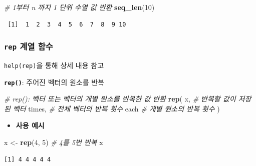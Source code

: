 \documentclass[
  11pt,
]{krantz}
\makeatletter
\newenvironment{Shaded}{\begin{snugshade}}{\end{snugshade}}
\newcommand{\CommentTok}[1]{\textcolor[rgb]{0.37,0.37,0.37}{\textit{#1}}}
\newcommand{\DecValTok}[1]{\textcolor[rgb]{0.06,0.06,0.06}{#1}}
\newcommand{\KeywordTok}[1]{\textcolor[rgb]{0.27,0.27,0.27}{\textbf{#1}}}
\newcommand{\NormalTok}[1]{#1}
\newcommand{\StringTok}[1]{\textcolor[rgb]{0.5,0.5,0.5}{#1}}
\providecommand{\tightlist}{%
  \setlength{\itemsep}{0pt}\setlength{\parskip}{0pt}}
\newenvironment{kframe}{%
\medskip{}
\setlength{\fboxsep}{.8em}
 \def\at@end@of@kframe{}%
 \ifinner\ifhmode%
  \def\at@end@of@kframe{\end{minipage}}%
  \begin{minipage}{\columnwidth}%
 \fi\fi%
 \def\FrameCommand##1{\hskip\@totalleftmargin \hskip-\fboxsep
 \colorbox{shadecolor}{##1}\hskip-\fboxsep
     \hskip-\linewidth \hskip-\@totalleftmargin \hskip\columnwidth}%
 \MakeFramed {\advance\hsize-\width
   \@totalleftmargin\z@ \linewidth\hsize
   \@setminipage}}%
 {\par\unskip\endMakeFramed%
 \at@end@of@kframe}
\renewenvironment{quote}{\begin{kframe}}{\end{kframe}}
\makeatother
\begin{document}
\begin{Shaded}
\begin{Highlighting}[]
\CommentTok{# 1부터 n 까지 1 단위 수열 값 반환}
\KeywordTok{seq_len}\NormalTok{(}\DecValTok{10}\NormalTok{)}
\end{Highlighting}
\end{Shaded}

\begin{verbatim}
 [1]  1  2  3  4  5  6  7  8  9 10
\end{verbatim}

\normalsize

\hypertarget{fun-rep}{%
\subsubsection*{\texorpdfstring{\textbf{\texttt{rep}} 계열 함수}{rep 계열 함수}}\label{fun-rep}}


\begin{quote}
\texttt{help(rep)}을 통해 상세 내용 참고
\end{quote}

\textbf{\texttt{rep()}}: 주어진 벡터의 원소를 반복

\footnotesize

\begin{Shaded}
\begin{Highlighting}[]
\CommentTok{# rep(): 벡터 또는 벡터의 개별 원소를 반복한 값 반환}
\KeywordTok{rep}\NormalTok{(}
\NormalTok{  x, }\CommentTok{# 반복할 값이 저장된 벡터}
\NormalTok{  times, }\CommentTok{# 전체 벡터의 반복 횟수}
\NormalTok{  each }\CommentTok{# 개별 원소의 반복 횟수}
\NormalTok{)}
\end{Highlighting}
\end{Shaded}

\normalsize

\begin{itemize}
\tightlist
\item
  \textbf{사용 예시}
\end{itemize}

\footnotesize

\begin{Shaded}
\begin{Highlighting}[]
\NormalTok{x <-}\StringTok{ }\KeywordTok{rep}\NormalTok{(}\DecValTok{4}\NormalTok{, }\DecValTok{5}\NormalTok{) }\CommentTok{# 4를 5번 반복}
\NormalTok{x}
\end{Highlighting}
\end{Shaded}

\begin{verbatim}
[1] 4 4 4 4 4
\end{verbatim}
\end{document}
